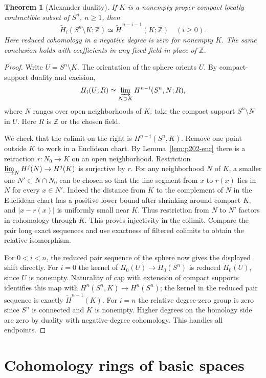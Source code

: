 \documentclass[11pt,oneside,openany]{book}
\theoremstyle{plain}
\newtheorem{theorem}{Theorem}[chapter]
\theoremstyle{definition}
\theoremstyle{remark}
\newcommand{\Z}{\mathbb Z}
\begin{document}
\begin{theorem}[Alexander duality]\label{thm:p202-alexander}
If \(K\) is a nonempty proper compact locally contractible
subset of \(S^n\), \(n\geq1\), then
\[
 \widetilde H_i(S^n\setminus K;\mathbb Z)
   \simeq \widetilde H^{\,n-i-1}(K;\mathbb Z)
 \quad(i\geq0).
\]
Here reduced cohomology in a negative degree is zero for
nonempty \(K\). The same conclusion holds with coefficients in
any fixed field in place of \(\Z\).
\end{theorem}
\begin{proof}
Write \(U=S^n\setminus K\). The orientation of the sphere
orients \(U\). By compact-support duality and excision,
\[
 H_i(U;R)\simeq
 \varinjlim_{N\supset K} H^{n-i}(S^n,N;R),
\]
where \(N\) ranges over open neighborhoods of \(K\):
take the compact support \(S^n\setminus N\) in \(U\).
Here \(R\) is \(\Z\) or the chosen field.

We check that the colimit on the right is \(H^{n-i}(S^n,K)\).
Remove one point outside \(K\) to work in a Euclidean chart.
By Lemma~\ref{lem:p202-enr} there is a retraction
\(r:N_0\to K\) on an open neighborhood. Restriction
\(\varinjlim_N H^j(N)\to H^j(K)\) is surjective by \(r\).
For any neighborhood \(N\) of \(K\), a smaller one
\(N'\subset N\cap N_0\) can be chosen so that the line
segment from \(x\) to \(r(x)\) lies in \(N\) for every
\(x\in N'\). Indeed the distance from \(K\) to the
complement of \(N\) in the Euclidean chart has a positive
lower bound after shrinking around compact \(K\), and
\(\lvert x-r(x)\rvert\) is uniformly small near \(K\).
Thus restriction from \(N\) to \(N'\) factors in
cohomology through \(K\). This proves injectivity in the
colimit. Compare the pair long exact sequences and use
exactness of filtered colimits to obtain the relative
isomorphism.

For \(0<i<n\), the reduced pair sequence of the sphere
now gives the displayed shift directly. For \(i=0\) the
kernel of \(H_0(U)\to H_0(S^n)\) is reduced \(H_0(U)\),
since \(U\) is nonempty. Naturality of cap with extension
of compact supports identifies this map with
\(H^n(S^n,K)\to H^n(S^n)\); the kernel in the reduced
pair sequence is exactly \(\widetilde H^{n-1}(K)\).
For \(i=n\) the relative degree-zero group is zero
since \(S^n\) is connected and \(K\) is nonempty.
Higher degrees on the homology side are zero by duality
with negative-degree cohomology. This handles all endpoints.
\end{proof}

\section{Cohomology rings of basic spaces}\label{p202:T28}
\end{document}

